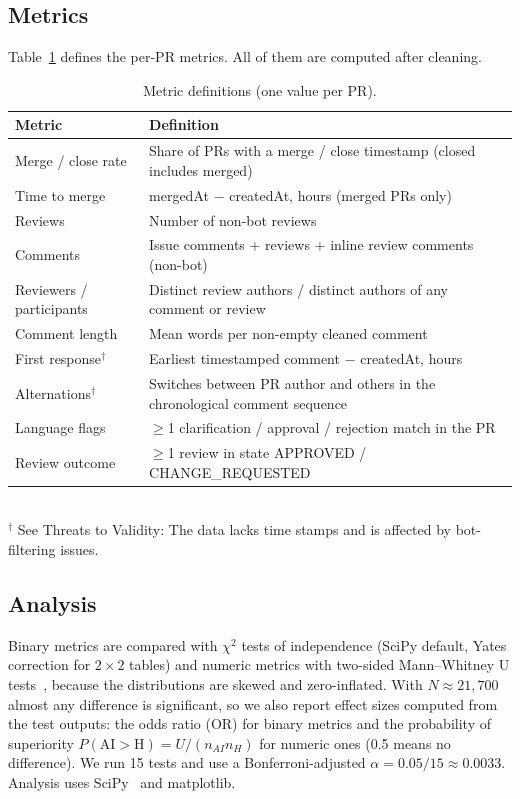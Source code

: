 \documentclass[conference]{IEEEtran}
\begin{document}
\subsection{Metrics}
Table~\ref{tab:metrics} defines the per-PR metrics. All of them are computed after cleaning.

\begin{table}[H]
\caption{Metric definitions (one value per PR).}
\label{tab:metrics}
\centering\small
\begin{tabular}{@{}p{0.95in}p{2.4in}@{}}
\toprule
Metric & Definition \\
\midrule
Merge / close rate & Share of PRs with a merge / close timestamp (closed includes merged) \\
Time to merge & mergedAt $-$ createdAt, hours (merged PRs only) \\
Reviews & Number of non-bot reviews \\
Comments & Issue comments + reviews + inline review comments (non-bot) \\
Reviewers / participants & Distinct review authors / distinct authors of any comment or review \\
Comment length & Mean words per non-empty cleaned comment \\
First response$^\dagger$ & Earliest timestamped comment $-$ createdAt, hours \\
Alternations$^\dagger$ & Switches between PR author and others in the chronological comment sequence \\
Language flags & $\geq$1 clarification / approval / rejection match in the PR \\
Review outcome & $\geq$1 review in state APPROVED / CHANGE\_REQUESTED\\
\bottomrule
\end{tabular}
\\[2pt]\footnotesize $^\dagger$ See Threats to Validity:  The data lacks time stamps and is affected by bot-filtering issues. 
\end{table}

\subsection{Analysis}
Binary metrics are compared with $\chi^2$ tests of independence (SciPy default, Yates correction for $2{\times}2$ tables) and numeric metrics with two-sided Mann--Whitney U tests~\cite{mannwhitney}, because the distributions are skewed and zero-inflated. With $N\approx 21{,}700$ almost any difference is significant, so we also report effect sizes computed from the test outputs: the odds ratio (OR) for binary metrics and the probability of superiority $P(\mathrm{AI}{>}\mathrm{H})=U/(n_{AI}n_{H})$ for numeric ones (0.5 means no difference). We run 15 tests and use a Bonferroni-adjusted $\alpha=0.05/15\approx0.0033$. Analysis uses SciPy~\cite{scipy} and matplotlib.
\end{document}
